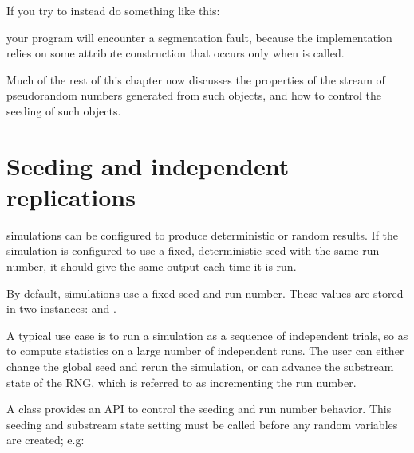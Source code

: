 \documentclass[letterpaper,10pt,english]{sphinxmanual}
\renewcommand{\sphinxcode}[1]{\texttt{\small{#1}}}
\begin{document}
If you try to instead do something like this:

\begin{sphinxVerbatim}[commandchars=\\\{\}]
   
\end{sphinxVerbatim}

your program will encounter a segmentation fault, because the implementation
relies on some attribute construction that occurs only when 
is called.

Much of the rest of this chapter now discusses the properties of the
stream of pseudo\sphinxhyphen{}random numbers generated from such objects, and how to
control the seeding of such objects.


\section{Seeding and independent replications}
\label{\detokenize{random-variables:id1}}
 simulations can be configured to produce deterministic or random results.
If the  simulation is configured to use a fixed, deterministic seed with
the same run number, it should give the same output each time it is run.

By default,  simulations use a fixed seed and run number.  These values
are stored in two \sphinxcode{} instances: \sphinxcode{} and
\sphinxcode{}.

A typical use case is to run a simulation as a sequence of independent trials,
so as to compute statistics on a large number of independent runs.  The user can
either change the global seed and rerun the simulation, or can advance the
substream state of the RNG, which is referred to as incrementing the run number.

A class \sphinxcode{} provides an API to control the seeding and
run number behavior.  This seeding and substream state setting must be called
before any random variables are created; e.g:
\end{document}
